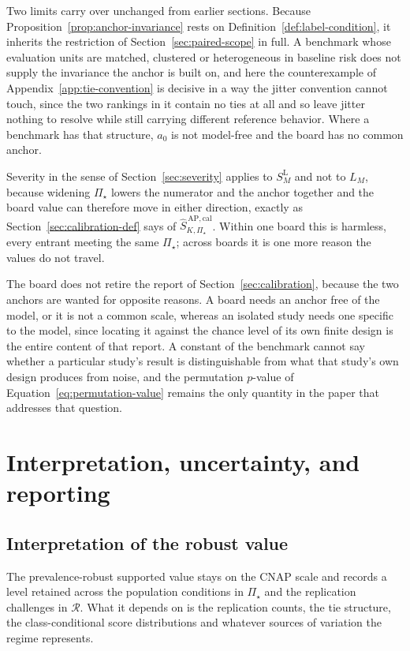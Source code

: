 \documentclass[11pt]{article}
\newcommand{\Regime}{\mathcal{R}}
\newcommand{\PSet}{\Pi_\star}
\newcommand{\SRobCalHat}{\widehat S_{K,\PSet}^{\,\mathrm{AP,cal}}}
\newcommand{\SLead}{S^{\mathrm{L}}}
\theoremstyle{remark}
\begin{document}
Two limits carry over unchanged from earlier sections. Because Proposition~\ref{prop:anchor-invariance} rests on Definition~\ref{def:label-condition}, it inherits the restriction of Section~\ref{sec:paired-scope} in full. A benchmark whose evaluation units are matched, clustered or heterogeneous in baseline risk does not supply the invariance the anchor is built on, and here the counterexample of Appendix~\ref{app:tie-convention} is decisive in a way the jitter convention cannot touch, since the two rankings in it contain no ties at all and so leave jitter nothing to resolve while still carrying different reference behavior. Where a benchmark has that structure, $a_0$ is not model-free and the board has no common anchor.

Severity in the sense of Section~\ref{sec:severity} applies to $\SLead_M$ and not to $L_M$, because widening $\PSet$ lowers the numerator and the anchor together and the board value can therefore move in either direction, exactly as Section~\ref{sec:calibration-def} says of $\SRobCalHat$. Within one board this is harmless, every entrant meeting the same $\PSet$; across boards it is one more reason the values do not travel.

The board does not retire the report of Section~\ref{sec:calibration}, because the two anchors are wanted for opposite reasons. A board needs an anchor free of the model, or it is not a common scale, whereas an isolated study needs one specific to the model, since locating it against the chance level of its own finite design is the entire content of that report. A constant of the benchmark cannot say whether a particular study's result is distinguishable from what that study's own design produces from noise, and the permutation $p$-value of Equation~\eqref{eq:permutation-value} remains the only quantity in the paper that addresses that question.

\section{Interpretation, uncertainty, and reporting}
\label{sec:reporting}

\subsection{Interpretation of the robust value}

The prevalence-robust supported value stays on the CNAP scale and records a level retained across the population conditions in $\PSet$ and the replication challenges in $\Regime$. What it depends on is the replication counts, the tie structure, the class-conditional score distributions and whatever sources of variation the regime represents.
\end{document}
